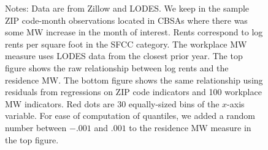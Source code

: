 \documentclass{article}
\begin{document}
\begin{figure}[h!]
    \begin{minipage}{.95\textwidth} \footnotesize
        \vspace{3mm}
        Notes: Data are from Zillow and LODES.
        We keep in the sample ZIP code-month observations located in CBSAs 
        where there was some MW increase in the month of interest. 
        Rents correspond to log rents per square foot in the SFCC category.
        The workplace MW measure uses LODES data from the closest prior year.
        The top figure shows the raw relationship between log rents
        and the residence MW.
        The bottom figure shows the same relationship using residuals from 
        regressions on ZIP code indicators and 100 workplace MW indicators.
        Red dots are 30 equally-sized bins of the $x$-axis variable.
        For ease of computation of quantiles, we added a random number between 
        $-.001$ and $.001$ to the residence MW measure in the top figure.
    \end{minipage}
\end{figure}
\end{document}
